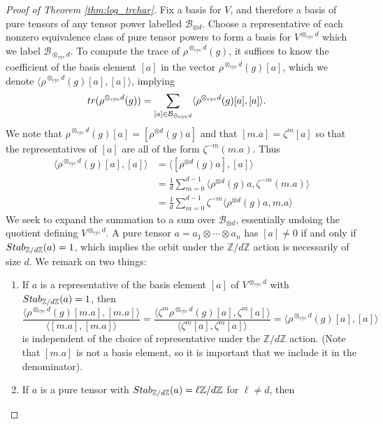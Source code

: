 \documentclass[10pt,a4paper]{amsart}
\newcommand{\Stab}{\textnormal{Stab}}
\newcommand{\Z}{\mathbb{Z}}
\begin{document}
\begin{proof}[Proof of Theorem \ref{thm:log_trchar}]
Fix a basis for $V$, and therefore a basis of pure tensors of any tensor power labelled $\mathcal{B}_{\otimes d}$. Choose a representative of each nonzero equivalence class of pure tensor powers to form a basis for $V^{\otimes_{\text{cyc}} d}$ which we label $\mathcal{B}_{\otimes_{\text{cyc}} d}$. To compute the trace of $\rho^{\otimes_{\text{cyc}} d}(g)$, it suffices to know the coefficient of the basis element $[a]$ in the vector $\rho^{\otimes_{\text{cyc}} d}(g)[a]$, which we denote $\langle \rho^{\otimes_{\text{cyc}} d}(g)[a],[a]\rangle$, implying
\begin{align*}
{\rm tr}(\rho^{\otimes_{\text{cyc}}d}(g)) &= \sum_{\substack{[a]\in\mathcal{B}_{\otimes_{\text{cyc}} d}}} \langle\rho^{\otimes_{\text{cyc}} d}(g)[a],[a]\rangle.
\end{align*}
We note that $\rho^{\otimes_{\text{cyc}} d}(g)[a] = [\rho^{\otimes d}(g) a]$ and that $[m.a]=\zeta^m[a]$ so that the representatives of $[a]$ are all of the form $\zeta^{-m}(m.a)$. Thus
\begin{align*}
\langle \rho^{\otimes_{\text{cyc}} d}(g)[a],[a]\rangle &= \langle [\rho^{\otimes d}(g)a],[a]\rangle\\
&= \frac{1}{d}\sum_{m=0}^{d-1} \langle \rho^{\otimes d}(g)a,\zeta^{-m}(m.a)\rangle\\
&= \frac{1}{d}\sum_{m=0}^{d-1} \zeta^{-m}\langle \rho^{\otimes d}(g)a,m.a\rangle
\end{align*}
We seek to expand the summation to a sum over $\mathcal{B}_{\otimes d}$, essentially undoing the quotient defining $V^{\otimes_{\text{cyc}}d}$. A pure tensor $a=a_1\otimes \cdots \otimes a_n$ has $[a]\ne 0$ if and only if $\Stab_{\Z/d\Z}(a)=1$, which implies the orbit under the $\Z/d\Z$ action is necessarily of size $d$. We remark on two things:
\begin{enumerate}
    \item{If $a$ is a representative of the basis element $[a]$ of $V^{\otimes_{\text{cyc}} d}$ with $\Stab_{\Z/d\Z}(a) = 1$, then
    \[
    \frac{\langle \rho^{\otimes_{\text{cyc}} d}(g)[m.a],[m.a]\rangle}{\langle [m.a],[m.a]\rangle} = \frac{\langle \zeta^m\rho^{\otimes_{\text{cyc}} d}(g)[a],\zeta^m[a]\rangle}{\langle \zeta^m[a],\zeta^m[a]\rangle} = \langle \rho^{\otimes_{\text{cyc}} d}(g)[a],[a]\rangle
    \]
    is independent of the choice of representative under the $\Z/d\Z$ action. (Note that $[m.a]$ is not a basis element, so it is important that we include it in the denominator).}
    \item{If $a$ is a pure tensor with $\Stab_{\Z/d\Z}(a) = \ell\Z/d\Z$ for $\ell\ne d$, then
}
\end{enumerate}
\end{proof}
\end{document}
